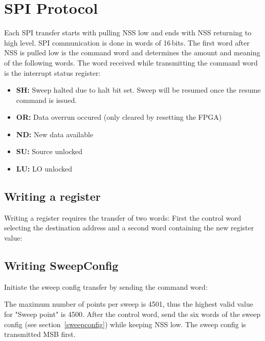 \documentclass{article}
\newcommand{\bitrect}[2]{
  \begin{pgfonlayer}{foreground}
    \draw [thick] (0,0) rectangle (#1,1);
    \pgfmathsetmacro\result{#1-1}
    \foreach \x in {1,...,\result}
      \draw [thick] (\x,1) -- (\x, 0.8);
  \end{pgfonlayer}
  \bitlabels{#1}{#2}
}
\newcommand{\rwbits}[3]{
  \draw [thick] (#1,0) rectangle ++(#2,1) node[pos=0.5]{#3};
  \pgfmathsetmacro\start{#1+0.5}
  \pgfmathsetmacro\finish{#1+#2-0.5}
}
\newcommand{\robits}[3]{
  \begin{pgfonlayer}{background}
    \draw [thick, fill=lightgray] (#1,0) rectangle ++(#2,1) node[pos=0.5]{#3};
  \end{pgfonlayer}
  \pgfmathsetmacro\start{#1+0.5}
  \pgfmathsetmacro\finish{#1+#2-0.5}
}
\newcommand{\bitlabels}[2]{
  \foreach \bit in {1,...,#1}{
     \pgfmathsetmacro\result{#2}
     \node [above] at (\bit-0.5, 1) {\pgfmathprintnumber{\result}};
   }
}
\begin{document}
\section{SPI Protocol}
Each SPI transfer starts with pulling NSS low and ends with NSS returning to high level. SPI communication is done in words of 16\,bits. The first word after NSS is pulled low is the command word and determines the amount and meaning of the following words.
The word received while transmitting the command word is the interrupt status register:
\begin{center}
\end{center}
\begin{itemize}
\item \textbf{SH:} Sweep halted due to halt bit set. Sweep will be resumed once the resume command is issued.
\item \textbf{OR:} Data overrun occured (only cleared by resetting the FPGA)
\item \textbf{ND:} New data available
\item \textbf{SU:} Source unlocked
\item \textbf{LU:} LO unlocked
\end{itemize}
\subsection{Writing a register}
Writing a register requires the transfer of two words: First the control word selecting the destination address and a second word containing the new register value:
\begin{center}
\end{center}
\subsection{Writing SweepConfig}
Initiate the sweep config transfer by sending the command word:
\begin{center}
\end{center}
The maximum number of points per sweep is 4501, thus the highest valid value for "Sweep point" is 4500. After the control word, send the six words of the sweep config (see section~\ref{sweepconfig}) while keeping NSS low. The sweep config is transmitted MSB first.
\end{document}
